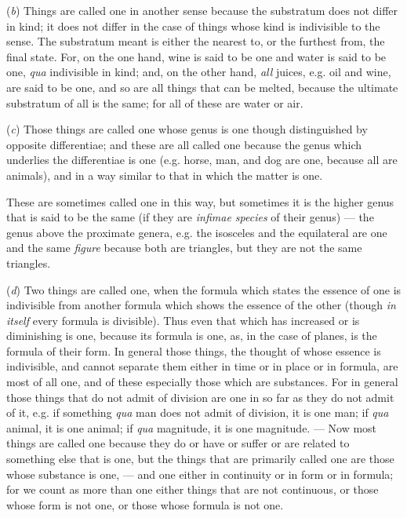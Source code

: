 (\emph{b}) Things are called one in another sense because the substratum does not differ in kind; it does not differ in the case of things whose kind is indivisible to the sense. The substratum meant is either the nearest to, or the furthest from, the final state. For, on the one hand, wine is said to be one and water is said to be one, \emph{qua} indivisible in kind; and, on the other hand, \emph{all} juices, e.g. oil and wine, are said to be one, and so are all things that can be melted, because the ultimate substratum of all is the same; for all of these are water or air.

(\emph{c}) Those things are called one whose genus is one though distinguished by opposite differentiae; and these are all called one because the genus which underlies the differentiae is one (e.g. horse, man, and dog are one, because all are animals), and in a way similar to that in which the matter is one.

These are sometimes called one in this way, but sometimes it is the higher genus that is said to be the same (if they are \emph{infimae species} of their genus) — the genus above the proximate genera, e.g. the isosceles and the equilateral are one and the same \emph{figure} because both are triangles, but they are not the same triangles.

(\emph{d}) Two things are called one, when the formula which states the essence of one is indivisible from another formula which shows the essence of the other (though \emph{in itself} every formula is divisible). Thus even that which has increased or is diminishing is one, because its formula is one, as, in the case of planes, is the formula of their form. In general those things, the thought of whose essence is indivisible, and cannot separate them either in time or in place or in formula, are most of all one, and of these especially those which are substances. For in general those things that do not admit of division are one in so far as they do not admit of it, e.g. if something \emph{qua} man does not admit of division, it is one man; if \emph{qua} animal, it is one animal; if \emph{qua} magnitude, it is one magnitude. — Now most things are called one because they do or have or suffer or are related to something else that is one, but the things that are primarily called one are those whose substance is one, — and one either in continuity or in form or in formula; for we count as more than one either things that are not continuous, or those whose form is not one, or those whose formula is not one.

